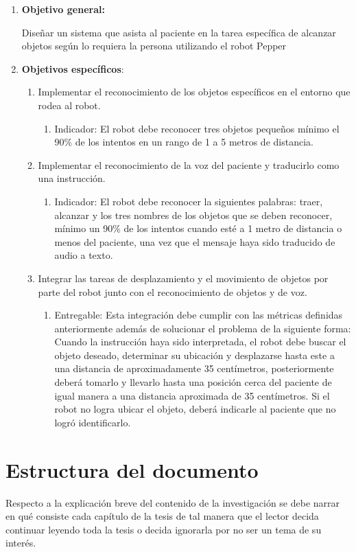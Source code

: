 \begin{enumerate}
    \item{\textbf{Objetivo general:}} 
    
    Diseñar un sistema que asista al paciente en la tarea específica de alcanzar objetos 
    según lo requiera la persona utilizando el robot Pepper
    \item{\textbf{Objetivos específicos}}:
    \begin{enumerate}
    \item Implementar el reconocimiento de los objetos específicos en el entorno que rodea al robot.
        \begin{enumerate}
            \item Indicador: El robot debe reconocer tres objetos pequeños mínimo el 90\% de los intentos 
            en un rango de 1 a 5 metros de distancia.
        \end{enumerate}
    
        \item Implementar el reconocimiento de la voz del paciente y traducirlo como una instrucción.
        \begin{enumerate}
            \item Indicador: El robot debe reconocer la siguientes palabras: traer, alcanzar y los tres nombres 
            de los objetos que se deben reconocer, mínimo un 90\% de los intentos cuando esté a 1 metro de 
            distancia o menos del paciente, una vez que el mensaje haya sido traducido de audio a texto.
        \end{enumerate}
        
        \item Integrar las tareas de desplazamiento y el movimiento de objetos por parte del robot junto con 
        el reconocimiento de objetos y de voz. 
        \begin{enumerate}
            \item Entregable: Esta integración debe cumplir con las métricas definidas anteriormente además 
            de solucionar el problema de la siguiente forma: Cuando la instrucción haya sido interpretada, 
            el robot debe buscar el objeto deseado, determinar su ubicación y desplazarse hasta este a una 
            distancia de aproximadamente 35 centímetros, posteriormente deberá tomarlo y llevarlo hasta una 
            posición cerca del paciente de igual manera a una distancia aproximada de 35 centímetros. 
            Si el robot no logra ubicar el objeto, deberá indicarle al paciente que no logró identificarlo.
            
        \end{enumerate}
    \end{enumerate}
\end{enumerate}




\section{Estructura del documento}
Respecto a la explicación breve del contenido de la investigación se debe narrar en qué consiste cada capítulo 
de la tesis de tal manera que el lector decida continuar leyendo toda la tesis o decida ignorarla por no ser un tema de su interés.
